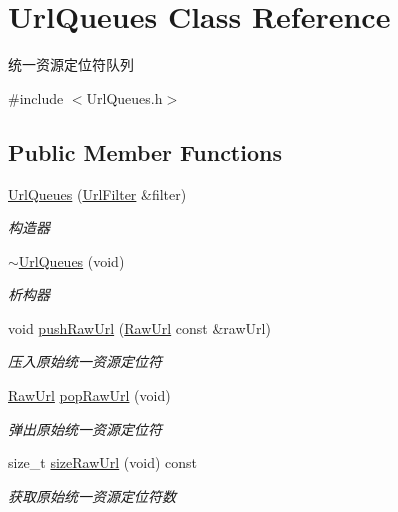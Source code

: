 \hypertarget{class_url_queues}{}\section{Url\+Queues Class Reference}
\label{class_url_queues}


统一资源定位符队列  




{\ttfamily \#include $<$Url\+Queues.\+h$>$}

\subsection*{Public Member Functions}
\begin{DoxyCompactItemize}
\item 
\hyperlink{class_url_queues_a9761fc84cfd4bf6188a73229873fafd5}{Url\+Queues} (\hyperlink{class_url_filter}{Url\+Filter} \&filter)
\begin{DoxyCompactList}\small\item\em 构造器 \end{DoxyCompactList}\item 
\mbox{\label{class_url_queues_aba370529b8c0cf49d068b1f5d5edafa0}} 
\hyperlink{class_url_queues_aba370529b8c0cf49d068b1f5d5edafa0}{$\sim$\+Url\+Queues} (void)
\begin{DoxyCompactList}\small\item\em 析构器 \end{DoxyCompactList}\item 
void \hyperlink{class_url_queues_a9649c30b72bdb4092732e505e4041e83}{push\+Raw\+Url} (\hyperlink{class_raw_url}{Raw\+Url} const \&raw\+Url)
\begin{DoxyCompactList}\small\item\em 压入原始统一资源定位符 \end{DoxyCompactList}\item 
\hyperlink{class_raw_url}{Raw\+Url} \hyperlink{class_url_queues_a8ceb4d6d67ce3b4afc7f0325ec254140}{pop\+Raw\+Url} (void)
\begin{DoxyCompactList}\small\item\em 弹出原始统一资源定位符 \end{DoxyCompactList}\item 
size\+\_\+t \hyperlink{class_url_queues_a713458484da28e9ada936ccc268413b3}{size\+Raw\+Url} (void) const
\begin{DoxyCompactList}\small\item\em 获取原始统一资源定位符数 \end{DoxyCompactList}\item 

\end{DoxyCompactItemize}
